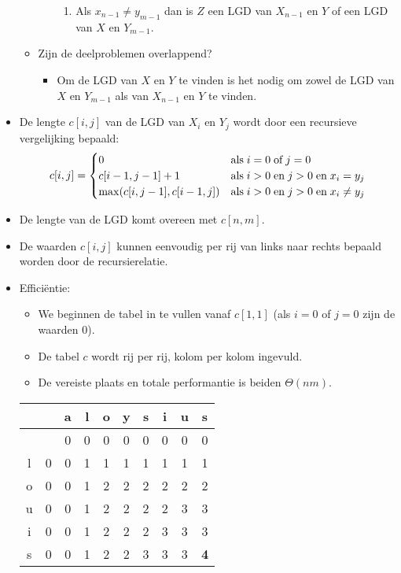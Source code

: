 \begin{itemize}
\begin{itemize}
\begin{itemize}
\begin{enumerate}
                \item Als $x_{n - 1} \neq y_{m - 1}$ dan is $Z$ een LGD van $X_{n - 1}$ en $Y$ of een LGD van $X$ en $Y_{m - 1}$.
            \end{enumerate}
        \end{itemize}
        \item Zijn de deelproblemen overlappend?
        \begin{itemize}
            \item Om de LGD van $X$ en $Y$ te vinden is het nodig om zowel de LGD van $X$ en $Y_{m - 1}$ als van $X_{n - 1}$ en $Y$ te vinden.
        \end{itemize}
    \end{itemize}
    \item De lengte $c[i, j]$ van de LGD van $X_i$ en $Y_j$ wordt door een recursieve vergelijking bepaald:
    $$c[i, j] = \begin{cases}
        0 & \hbox{als}\; i = 0\;\hbox{of}\; j = 0 \\
        c[i - 1, j - 1] + 1 & \hbox{als}\; i >0\;\hbox{en}\; j > 0\;\hbox{en}\; x_i = y_j\\
        \max(c[i, j- 1], c[i - 1, j]) & \hbox{als}\; i >0\;\hbox{en}\; j > 0\;\hbox{en}\; x_i \neq y_j\\
    \end{cases}$$
    \item De lengte van de LGD komt overeen met $c[n, m]$.
    \item De waarden $c[i, j]$ kunnen eenvoudig per rij van links naar rechts bepaald worden door de recursierelatie.
    \item Efficiëntie:
    \begin{itemize}
        \item We beginnen de tabel in te vullen vanaf $c[1, 1]$ (als $i = 0$ of $j = 0$ zijn de waarden 0).
        \item De tabel $c$ wordt rij per rij, kolom per kolom ingevuld.
        \item De vereiste plaats en totale performantie is beiden $\Theta(nm)$.
    \end{itemize}


    \begin{table}[ht]
        \centering
        \begin{tabular}{c| c c c c c c c c c}
             & &a&l&o&y&s&i&u&s\\
             \hline
             & &0&0&0&0&0&0&0&0\\
            l&0&0&1&1&1&1&1&1&1\\
            o&0&0&1&2&2&2&2&2&2\\
            u&0&0&1&2&2&2&2&3&3\\
            i&0&0&1&2&2&2&3&3&3\\
            s&0&0&1&2&2&3&3&3&\textbf{4} 
        \end{tabular}
    \end{table}

\end{itemize}

